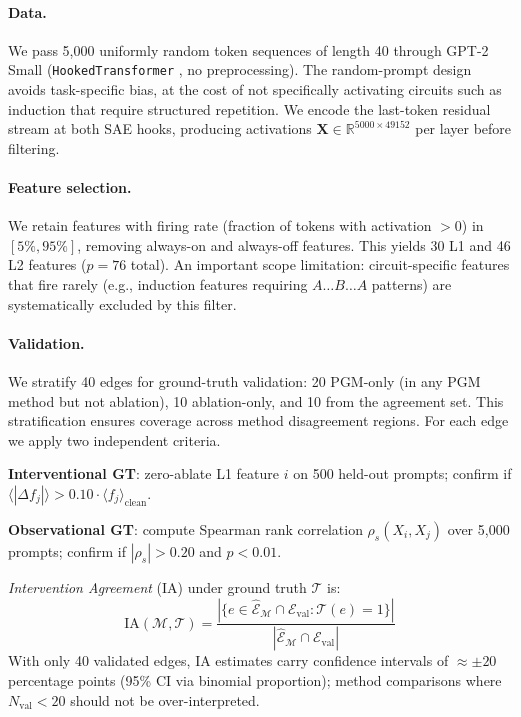 \documentclass{article}
\begin{document}
\paragraph{Data.}
We pass 5,000 uniformly random token sequences of length 40 through GPT-2
Small (\texttt{HookedTransformer} \citep{nanda2022transformerlens}, no
preprocessing). The random-prompt design avoids task-specific bias, at the
cost of not specifically activating circuits such as induction that require
structured repetition. We encode the last-token residual stream at both SAE
hooks, producing activations $\mathbf{X} \in \mathbb{R}^{5000 \times 49152}$
per layer before filtering.

\paragraph{Feature selection.}
We retain features with firing rate (fraction of tokens with activation $> 0$)
in $[5\%, 95\%]$, removing always-on and always-off features. This yields 30
L1 and 46 L2 features ($p = 76$ total). An important scope limitation:
circuit-specific features that fire rarely (e.g., induction features requiring
$A \ldots B \ldots A$ patterns) are systematically excluded by this filter.

\paragraph{Validation.}
We stratify 40 edges for ground-truth validation: 20 PGM-only (in any PGM
method but not ablation), 10 ablation-only, and 10 from the agreement set.
This stratification ensures coverage across method disagreement regions.
For each edge we apply two independent criteria.

\textbf{Interventional GT}: zero-ablate L1 feature $i$ on 500 held-out
prompts; confirm if $\langle|\Delta f_j|\rangle > 0.10 \cdot \langle
f_j\rangle_{\text{clean}}$.

\textbf{Observational GT}: compute Spearman rank correlation $\rho_s(X_i,
X_j)$ over 5,000 prompts; confirm if $|\rho_s| > 0.20$ and $p < 0.01$.

\emph{Intervention Agreement} (IA) under ground truth $\mathcal{T}$ is:
\[
  \text{IA}(\mathcal{M}, \mathcal{T}) =
  \frac{|\{e \in \hat{\mathcal{E}}_\mathcal{M} \cap
  \mathcal{E}_{\text{val}} : \mathcal{T}(e) = 1\}|}
  {|\hat{\mathcal{E}}_\mathcal{M} \cap \mathcal{E}_{\text{val}}|}
\]
With only 40 validated edges, IA estimates carry confidence intervals of
$\approx \pm 20$ percentage points (95\% CI via binomial proportion); method
comparisons where $N_{\text{val}} < 20$ should not be over-interpreted.
\end{document}

